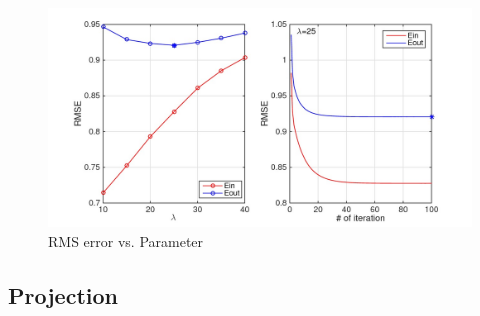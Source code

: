 \documentclass[12pt]{article}
\begin{document}
\begin{figure}[h!]
  \centering
      \includegraphics[width=1.0\textwidth]{testparameter}
  \caption{RMS error vs. Parameter}
\end{figure}


\subsection{Projection}
\end{document}
